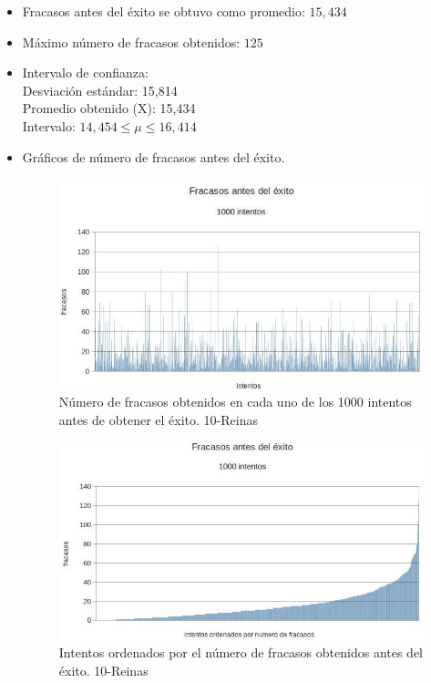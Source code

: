 \documentclass[a4paper,10pt]{article}
\begin{document}
\begin{itemize}
\item Fracasos antes del éxito se obtuvo como promedio: $15,434$
\item Máximo número de fracasos obtenidos: $125$
\item Intervalo de confianza: \\
  Desviación estándar: 15,814 \\
  Promedio obtenido (X): 15,434\\
  Intervalo: $ 14,454  \leq \mu \leq 16,414$ \\

\item Gráficos de número de fracasos antes del éxito.

\begin{figure}
 \centering
 \includegraphics[scale=0.5]{fracasos10.jpg}
 \caption{Número de fracasos obtenidos en cada uno de los 1000 intentos antes de obtener el éxito. 10-Reinas}
 \label{fig:fracasos10}
\end{figure}

\begin{figure}
 \centering
 \includegraphics[scale=0.5]{fracasosOrd10.jpg}
 \caption{Intentos ordenados por el número de fracasos obtenidos antes del éxito. 10-Reinas}
 \label{fig:fracasos10Ord}
\end{figure}


\end{itemize}
\end{document}

